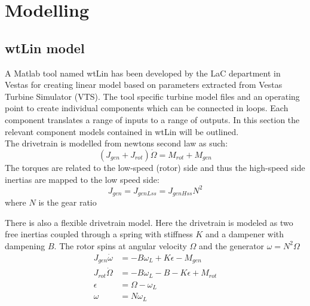 \section{Modelling} \label{sec:mod} %

\subsection{wtLin model}
A Matlab tool named wtLin has been developed by the LaC department in Vestas for creating linear model based on parameters extracted from Vestas Turbine Simulator (VTS). The tool specific turbine model files and an operating point to create individual components which can be connected in loops. Each component translates a range of inputs to a range of outputs. In this section the relevant component models contained in wtLin will be outlined.\\

The drivetrain is modelled from newtons second law as such:
\begin{equation}\label{eq:wtlin_comp_drivetrain}
	(J_{gen} + J_{rot}) \dot{\Omega} = M_{rot} + M_{gen}
\end{equation}
The torques are related to the low-speed (rotor) side and thus the high-speed side inertias are mapped to the low speed side:
\begin{equation}\label{eq:wtlin_comp_inertiamap}
	J_{gen} = J_{genLss} = J_{genHss} N^2
\end{equation}
where $ N $ is the gear ratio

There is also a flexible drivetrain model. Here the drivetrain is modeled as two free inertias coupled through a spring with stiffness $ K $ and a dampener with dampening $ B $. The rotor spins at angular velocity $ \Omega $ and the generator $ \omega = N^2 \Omega $
\begin{align}\label{eq:wtlin_comp_drivetrain_flex}
	J_{gen} \dot{\omega} & = -B \omega_L + K \epsilon - M_{gen} \\
	J_{rot} \dot{\Omega} & = -B \omega_L -B - K \epsilon + M_{rot} \\
	\epsilon & = \Omega - \omega_L \\
	\omega & = N \omega_L
\end{align}












%	

